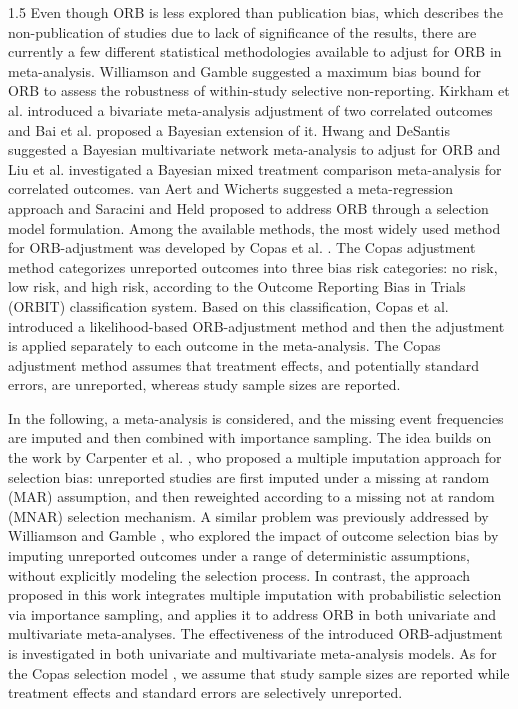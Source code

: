 \documentclass{article}
\begin{document}
\begin{spacing}{1.5}
Even though ORB is less explored than publication bias, which describes the non-publication of studies due to lack of significance of the results, there are currently a few different statistical methodologies available to adjust for ORB in meta-analysis. Williamson and Gamble \cite{williamson2007application} suggested a maximum bias bound for ORB to assess the robustness of within-study selective non-reporting. Kirkham et al. \cite{kirkham2012multivariate} introduced a bivariate meta-analysis adjustment of two correlated outcomes and Bai et al. \cite{bai2021bayesian} proposed a Bayesian extension of it. Hwang and DeSantis \cite{hwang2018multivariate} suggested a Bayesian multivariate network meta-analysis to adjust for ORB and Liu et al. \cite{liu2018bayesian} investigated a Bayesian mixed treatment comparison meta-analysis for correlated outcomes. van Aert and Wicherts \cite{van2024correcting} suggested a meta-regression approach and Saracini and Held \cite{saracini2025addressing} proposed to address ORB through a selection model formulation. Among the available methods, the most widely used method for ORB-adjustment was developed by Copas et al. \cite{copas2019model}. The Copas adjustment method categorizes unreported outcomes into three bias risk categories: no risk, low risk, and high risk, according to the Outcome Reporting Bias in Trials (ORBIT) classification system. Based on this classification, Copas et al. \cite{copas2019model} introduced a likelihood-based ORB-adjustment method and then the adjustment is applied separately to each outcome in the meta-analysis. The Copas adjustment method assumes that treatment effects, and potentially standard errors, are unreported, whereas study sample sizes are reported.

In the following, a meta-analysis is considered, and the missing event frequencies are imputed and then combined with importance sampling. The idea builds on the work by Carpenter et al. \cite{carpenter2011assessing}, who proposed a multiple imputation approach for selection bias: unreported studies are first imputed under a missing at random (MAR) assumption, and then reweighted according to a missing not at random (MNAR) selection mechanism. A similar problem was previously addressed by Williamson and Gamble \cite{williamson2005identification}, who explored the impact of outcome selection bias by imputing unreported outcomes under a range of deterministic assumptions, without explicitly modeling the selection process. In contrast, the approach proposed in this work integrates multiple imputation with probabilistic selection via importance sampling, and applies it to address ORB in both univariate and multivariate meta-analyses. The effectiveness of the introduced ORB-adjustment is investigated in both univariate and multivariate meta-analysis models. As for the Copas selection model \cite{copas2019model}, we assume that study sample sizes are reported while treatment effects and standard errors are selectively unreported. 


\end{spacing}
\end{document}
